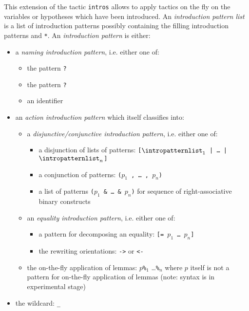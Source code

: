 \begin{coq_example*}
This extension of the tactic {\tt intros} allows to apply tactics on
the fly on the variables or hypotheses which have been introduced. An
{\em introduction pattern list} {\intropatternlist} is a list of
introduction patterns possibly containing the filling introduction
patterns {\tt *} and {\tt **}. An {\em introduction pattern} is
either:
\begin{itemize}
\item a {\em naming introduction pattern}, i.e. either one of:
  \begin{itemize}
  \item the pattern \texttt{?}
  \item the pattern \texttt{?\ident}
  \item an identifier
  \end{itemize}
\item an {\em action introduction pattern} which itself classifies into:
  \begin{itemize}
  \item a {\em disjunctive/conjunctive introduction pattern}, i.e. either one of:
    \begin{itemize}
    \item a disjunction of lists of patterns:
      {\tt [$\intropatternlist_1$ | \dots\ | $\intropatternlist_n$]}
    \item a conjunction of patterns: {\tt ($p_1$ , \dots\ , $p_n$)}
    \item a list of patterns {\tt ($p_1$ \&\ \dots\ \&\ $p_n$)}
      for sequence of right-associative binary constructs
    \end{itemize}
  \item an {\em equality introduction pattern}, i.e. either one of:
    \begin{itemize}
    \item a pattern for decomposing an equality: {\tt [= $p_1$ \dots\ $p_n$]}
    \item the rewriting orientations: {\tt ->} or {\tt <-}
    \end{itemize}
  \item the on-the-fly application of lemmas: $p${\tt \%{\term$_1$}}
    \ldots {\tt \%{\term$_n$}} where $p$ itself is not a pattern for
    on-the-fly application of lemmas (note: syntax is in experimental stage)
  \end{itemize}
\item the wildcard: {\tt \_}
\end{itemize}


\end{coq_example*}
